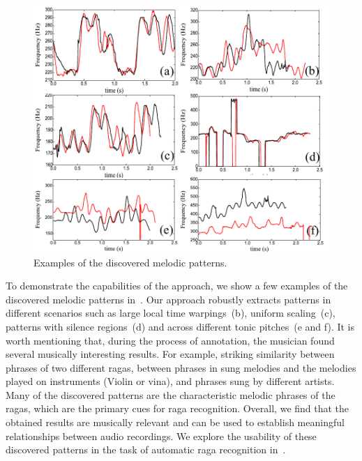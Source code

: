 \begin{figure}
	\begin{center}
		\includegraphics[width=\figSizeHundred]{ch06_patterns/figures/discovery/combinedPatterns.pdf}
	\end{center}
	\caption{Examples of the discovered melodic patterns.}
	\label{fig:combinedPatternsDiscovered}
\end{figure}

To demonstrate the capabilities of the approach, we show a few examples of the discovered melodic patterns in~. Our approach robustly extracts patterns in different scenarios such as large local time warpings~(b), uniform scaling~(c), patterns with silence regions~(d) and across different tonic pitches~(e and f). It is worth mentioning that, during the process of annotation, the musician found several musically interesting results. For example, striking similarity between phrases of two different \glspl{raga}, between phrases in sung melodies and the melodies played on instruments (Violin or \Gls{vina}), and phrases sung by different artists. Many of the discovered patterns are the characteristic melodic phrases of the \glspl{raga}, which are the primary cues for \gls{raga} recognition. Overall, we find that the obtained results are musically relevant and can be used to establish meaningful relationships between audio recordings. We explore the usability of these discovered patterns in the task of automatic \gls{raga} recognition in~.


